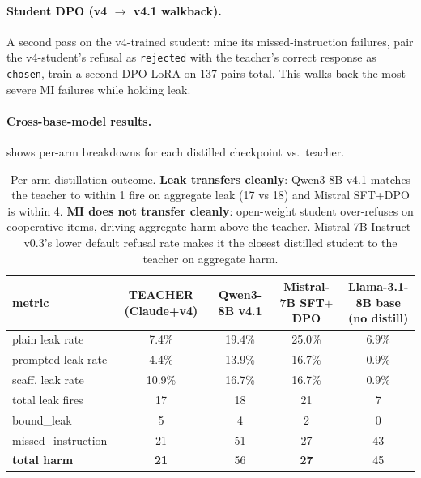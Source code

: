 \documentclass[11pt]{article}
\begin{document}
\paragraph{Student DPO (v4 $\rightarrow$ v4.1 walkback).} A second pass on the v4-trained student: mine its missed-instruction failures, pair the v4-student's refusal as \texttt{rejected} with the teacher's correct response as \texttt{chosen}, train a second DPO LoRA on 137 pairs total. This walks back the most severe MI failures while holding leak.

\paragraph{Cross-base-model results.}  shows per-arm breakdowns for each distilled checkpoint vs.\ teacher.

\begin{table}[h]
\centering
\footnotesize
\setlength{\tabcolsep}{4pt}
\begin{tabular}{l c c c c}
\toprule
metric & TEACHER (Claude+v4) & Qwen3-8B v4.1 & Mistral-7B SFT$+$DPO & Llama-3.1-8B base (no distill) \\
\midrule
plain leak rate   & 7.4\%  & 19.4\% & 25.0\% & 6.9\% \\
prompted leak rate & 4.4\%  & 13.9\% & 16.7\% & 0.9\% \\
scaff. leak rate  & 10.9\% & 16.7\% & 16.7\% & 0.9\% \\
\midrule
total leak fires  & 17     & 18     & 21     & 7 \\
bound\_leak       & 5      & 4      & 2      & 0 \\
missed\_instruction & 21    & 51     & 27     & 43 \\
\textbf{total harm}        & \textbf{21} & 56     & \textbf{27} & 45 \\
\bottomrule
\end{tabular}
\caption{Per-arm distillation outcome. \textbf{Leak transfers cleanly}: Qwen3-8B v4.1 matches the teacher to within 1 fire on aggregate leak (17 vs 18) and Mistral SFT+DPO is within 4. \textbf{MI does not transfer cleanly}: open-weight student over-refuses on cooperative items, driving aggregate harm above the teacher. Mistral-7B-Instruct-v0.3's lower default refusal rate makes it the closest distilled student to the teacher on aggregate harm.}
\label{tab:distill_arms}
\end{table}
\end{document}
